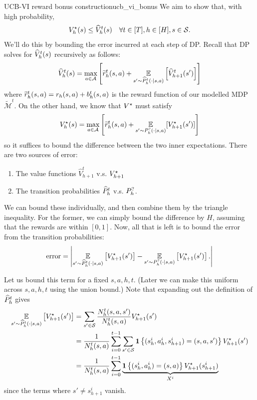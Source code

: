 \documentclass[\main/main]{subfiles}
\begin{document}
\begin{derivation}{UCB-VI reward bonus construction}{ucb_vi_bonus}
    We aim to show that, with high probability, \[
        V_h^\star(s) \le \widehat{V}_h^t(s) \quad \forall t \in [T], h \in [H], s \in \mathcal{S}.
    \]
    We'll do this by bounding the error incurred at each step of DP. Recall that DP solves for $\widehat{V}_h^t(s)$ recursively as follows:
    \[
        \widehat{V}_h^t(s) = \max_{a \in \mathcal{A}} \left[ \widetilde r^t_h(s, a) + \operatorname*{\mathbb{E}}_{s' \sim \widehat{P}_h^t(\cdot \mid s, a)} \left[ \widehat{V}_{h+1}^t(s') \right] \right]
    \]
    where $\widetilde r^t_h(s, a) = r_h(s, a) + b_h^t(s, a)$ is the reward function of our modelled MDP $\tilde{\mathcal{M}}^t$. On the other hand, we know that $V^\star$ must satisfy
    \[
        V^\star_h(s) = \max_{a \in \mathcal{A}} \left[ \widetilde r^t_h(s, a) + \operatorname*{\mathbb{E}}_{s' \sim P^?_h(\cdot \mid s, a)} [V^\star_{h+1}(s')] \right]
    \]
    so it suffices to bound the difference between the two inner expectations.
    There are two sources of error:
    \begin{enumerate}
        \item The value functions $\hat{V}^t_{h+1}$ v.s. $V^\star_{h+1}$
        \item The transition probabilities $\widehat{P}_h^t$ v.s. $P^?_h$.
    \end{enumerate}
    We can bound these individually, and then combine them by the triangle inequality.
    For the former, we can simply bound the difference by $H$, assuming that the rewards are within $[0, 1]$.
    Now, all that is left is to bound the error from the transition probabilities:
    \begin{equation}
        \text{error} = \left| \operatorname*{\mathbb{E}}_{s' \sim \widehat{P}_h^t(\cdot \mid s, a)} \left[ V^\star_{h+1}(s') \right] - \operatorname*{\mathbb{E}}_{s' \sim P^?_h(\cdot \mid s, a)} \left[ V^\star_{h+1}(s') \right]. \right|
        \label{eq:err}
    \end{equation}

    Let us bound this term for a fixed $s, a, h, t$. (Later we can make this uniform across $s, a, h, t$ using the union bound.)
    Note that expanding out the definition of $\widehat{P}_h^t$ gives
    \begin{align*}
        \operatorname*{\mathbb{E}}_{s' \sim \widehat{P}_h^t(\cdot \mid s, a)} \left[ V^\star_{h+1}(s') \right] & = \sum_{s' \in \mathcal{S}} \frac{N^t_h(s, a, s')}{N^t_h(s, a)} V^\star_{h+1}(s')                                                     \\
                                                                                   & = \frac{1}{N^t_h(s, a)} \sum_{i=0}^{t-1} \sum_{s' \in \mathcal{S}} \mathbf{1}\left\{ (s_h^i, a_h^i, s_{h+1}^i) = (s, a, s') \right\} V^\star_{h+1}(s') \\
                                                                                   & = \frac{1}{N^t_h(s, a)} \sum_{i=0}^{t-1} \underbrace{\mathbf{1}\left\{ (s_h^i, a_h^i) = (s, a) \right\} V^\star_{h+1}(s_{h+1}^i)}_{X^i}
    \end{align*}
    since the terms where $s' \neq s_{h+1}^i$ vanish.


\end{derivation}
\end{document}
